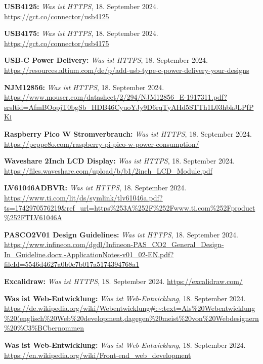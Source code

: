 \begin{literature}
\textbf{USB4125:} \textit{Was ist HTTPS}, 18. September 2024. \url{https://gct.co/connector/usb4125}

\textbf{USB4175:} \textit{Was ist HTTPS}, 18. September 2024. \url{https://gct.co/connector/usb4175}

\textbf{USB-C Power Delivery:} \textit{Was ist HTTPS}, 18. September 2024. \url{https://resources.altium.com/de/p/add-usb-type-c-power-delivery-your-designs}

\textbf{NJM12856:} \textit{Was ist HTTPS}, 18. September 2024. \url{https://www.mouser.com/datasheet/2/294/NJM12856_E-1917311.pdf?srsltid=AfmBOopjT0bgSb_HDB46CyuoYJy9D6rqTyAHd5STTh1L03hbkJLPfPKi}

\textbf{Raspberry Pico W Stromverbrauch:} \textit{Was ist HTTPS}, 18. September 2024. \url{https://peppe8o.com/raspberry-pi-pico-w-power-consumption/}

\textbf{Waveshare 2Inch LCD Display:} \textit{Was ist HTTPS}, 18. September 2024. \url{https://files.waveshare.com/upload/b/b1/2inch_LCD_Module.pdf}

\textbf{LV61046ADBVR:} \textit{Was ist HTTPS}, 18. September 2024. \url{https://www.ti.com/lit/ds/symlink/tlv61046a.pdf?ts=1742970576219&ref_url=https%253A%252F%252Fwww.ti.com%252Fproduct%252FTLV61046A}

\textbf{PASCO2V01 Design Guidelines:} \textit{Was ist HTTPS}, 18. September 2024. \url{https://www.infineon.com/dgdl/Infineon-PAS_CO2_General_Design-In_Guideline.docx.-ApplicationNotes-v01_02-EN.pdf?fileId=5546d4627a0b0c7b017a5174394768a1}

\textbf{Excalidraw:} \textit{Was ist HTTPS}, 18. September 2024. \url{https://excalidraw.com/}



\textbf{Was ist Web-Entwicklung:} \textit{Was ist Web-Entwicklung}, 18. September 2024. \url{https://de.wikipedia.org/wiki/Webentwicklung#:~:text=Als%20Webentwicklung%20(englisch%20Web%20development,dagegen%20meist%20von%20Webdesignern%20%C3%BCbernommen}

\textbf{Was ist Web-Entwicklung:} \textit{Was ist Web-Entwicklung}, 18. September 2024. \url{https://en.wikipedia.org/wiki/Front-end_web_development}


\end{literature}
